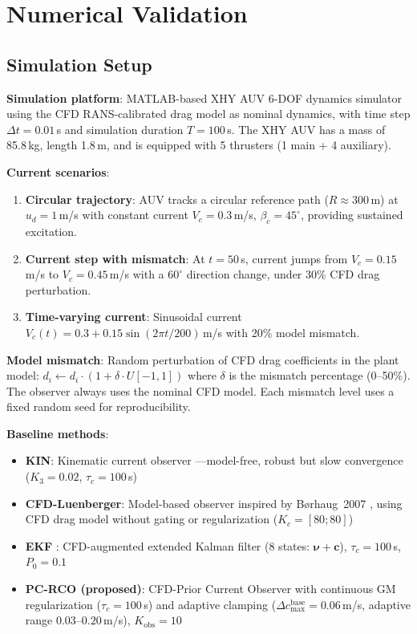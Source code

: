 \section{Numerical Validation}

\subsection{Simulation Setup}

\textbf{Simulation platform}: MATLAB-based XHY AUV 6-DOF dynamics simulator using the CFD RANS-calibrated drag model as nominal dynamics, with time step $\Delta t=0.01$\,s and simulation duration $T=100$\,s. The XHY AUV has a mass of 85.8\,kg, length 1.8\,m, and is equipped with 5 thrusters (1 main + 4 auxiliary).

\textbf{Current scenarios}:
\begin{enumerate}[itemsep=0pt,topsep=4pt]
    \item \textbf{Circular trajectory}: AUV tracks a circular reference path ($R\approx300$\,m) at $u_d=1$\,m/s with constant current $V_c=0.3$\,m/s, $\beta_c=45^\circ$, providing sustained excitation.
    \item \textbf{Current step with mismatch}: At $t=50$\,s, current jumps from $V_c=0.15$\,m/s to $V_c=0.45$\,m/s with a $60^\circ$ direction change, under 30\% CFD drag perturbation.
    \item \textbf{Time-varying current}: Sinusoidal current $V_c(t)=0.3+0.15\sin(2\pi t/200)$\,m/s with 20\% model mismatch.
\end{enumerate}

\textbf{Model mismatch}: Random perturbation of CFD drag coefficients in the plant model: $d_i \leftarrow d_i \cdot (1 + \delta \cdot U[-1,1])$ where $\delta$ is the mismatch percentage (0--50\%). The observer always uses the nominal CFD model. Each mismatch level uses a fixed random seed for reproducibility.

\textbf{Baseline methods}:
\begin{itemize}[itemsep=0pt,topsep=4pt]
    \item \textbf{KIN}: Kinematic current observer \cite{liang2018three}---model-free, robust but slow convergence ($K_3=0.02$, $\tau_c=100$\,s)
    \item \textbf{CFD-Luenberger}: Model-based observer inspired by B{\o}rhaug~2007 \cite{borhaug2007model}, using CFD drag model without gating or regularization ($K_c=[80;80]$)
    \item \textbf{EKF} \cite{long2021trajectory}: CFD-augmented extended Kalman filter (8 states: $\bm{\nu}+\bm{c}$), $\tau_c=100$\,s, $P_0=0.1$
    \item \textbf{PC-RCO (proposed)}: CFD-Prior Current Observer with continuous GM regularization ($\tau_c=100$\,s) and adaptive clamping ($\Delta c_{\max}^{\text{base}}=0.06$\,m/s, adaptive range $0.03$--$0.20$\,m/s), $K_{\text{obs}}=10$
\end{itemize}


